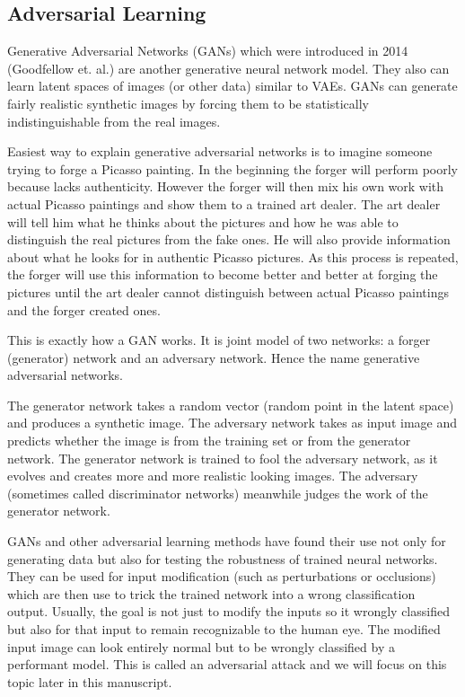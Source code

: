 \documentclass[b5paper]{book}
\let\cite\parencite
\begin{document}
\subsection{Adversarial Learning}

Generative Adversarial Networks (GANs) which were introduced in 2014 (Goodfellow et. al.) \cite{goodfellowexplaining} are another generative neural network model. They also can learn latent spaces of images (or other data) similar to VAEs. GANs can generate fairly realistic synthetic images by forcing them to be statistically indistinguishable from the real images.

Easiest way to explain generative adversarial networks is to imagine someone trying to forge a Picasso painting. In the beginning the forger will perform poorly because lacks authenticity. However the forger will then mix his own work with actual Picasso paintings and show them to a trained art dealer. The art dealer will tell him what he thinks about the pictures and how he was able to distinguish the real pictures from the fake ones. He will also provide information about what he looks for in authentic Picasso pictures. As this process is repeated, the forger will use this information to become better and better at forging the pictures until the art dealer cannot distinguish between actual Picasso paintings and the forger created ones.

This is exactly how a GAN works. It is joint model of two networks: a forger (generator) network and an adversary network. Hence the name generative adversarial networks.

The generator network takes a random vector (random point in the latent space) and produces a synthetic image. The adversary network takes as input image and predicts whether the image is from the training set or from the generator network. The generator network is trained to fool the adversary network, as it evolves and creates more and more realistic looking images. The adversary (sometimes called discriminator networks) meanwhile judges the work of the generator network.

GANs and other adversarial learning methods have found their use not only for generating data but also for testing the robustness of trained neural networks. They can be used for input modification (such as perturbations or occlusions) which are then use to trick the trained network into a wrong classification output. Usually, the goal is not just to modify the inputs so it wrongly classified but also for that input to remain recognizable to the human eye. The modified input image can look entirely normal but to be wrongly classified by a performant model. This is called an adversarial attack and we will focus on this topic later in this manuscript.
\end{document}
